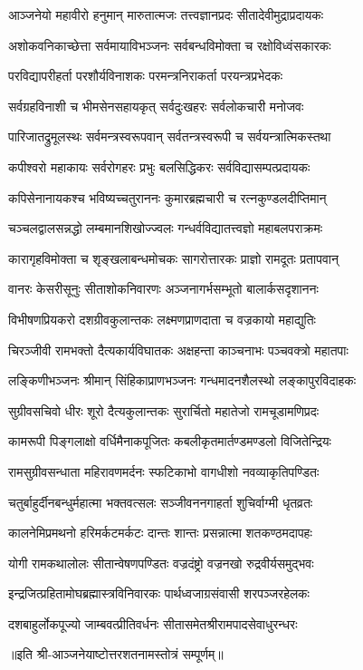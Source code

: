 

\twolineshloka
{आञ्जनेयो महावीरो हनुमान् मारुतात्मजः}
{तत्त्वज्ञानप्रदः सीतादेवीमुद्राप्रदायकः}

\twolineshloka
{अशोकवनिकाच्छेत्ता सर्वमायाविभञ्जनः}
{सर्वबन्धविमोक्ता च रक्षोविध्वंसकारकः}

\twolineshloka
{परविद्यापरीहर्ता परशौर्यविनाशकः}
{परमन्त्रनिराकर्ता परयन्त्रप्रभेदकः}

\twolineshloka
{सर्वग्रहविनाशी च भीमसेनसहायकृत्}
{सर्वदुःखहरः सर्वलोकचारी मनोजवः}

\twolineshloka
{पारिजातद्रुमूलस्थः सर्वमन्त्रस्वरूपवान्}
{सर्वतन्त्रस्वरूपी च सर्वयन्त्रात्मिकस्तथा}

\twolineshloka
{कपीश्वरो महाकायः सर्वरोगहरः प्रभुः}
{बलसिद्धिकरः सर्वविद्यासम्पत्प्रदायकः}

\twolineshloka
{कपिसेनानायकश्च भविष्यच्चतुराननः}
{कुमारब्रह्मचारी च रत्नकुण्डलदीप्तिमान्}

\twolineshloka
{चञ्चलद्वालसन्नद्धो लम्बमानशिखोज्ज्वलः}
{गन्धर्वविद्यातत्त्वज्ञो महाबलपराक्रमः}

\twolineshloka
{कारागृहविमोक्ता च शृङ्खलाबन्धमोचकः}
{सागरोत्तारकः प्राज्ञो रामदूतः प्रतापवान्}

\twolineshloka
{वानरः केसरीसूनुः सीताशोकनिवारणः}
{अञ्जनागर्भसम्भूतो बालार्कसदृशाननः}

\twolineshloka
{विभीषणप्रियकरो दशग्रीवकुलान्तकः}
{लक्ष्मणप्राणदाता च वज्रकायो महाद्युतिः}

\twolineshloka
{चिरञ्जीवी रामभक्तो दैत्यकार्यविघातकः}
{अक्षहन्ता काञ्चनाभः पञ्चवक्त्रो महातपाः}

\twolineshloka
{लङ्किणीभञ्जनः श्रीमान् सिंहिकाप्राणभञ्जनः}
{गन्धमादनशैलस्थो लङ्कापुरविदाहकः}

\twolineshloka
{सुग्रीवसचिवो धीरः शूरो दैत्यकुलान्तकः}
{सुरार्चितो महातेजो रामचूडामणिप्रदः}

\twolineshloka
{कामरूपी पिङ्गलाक्षो वर्धिमैनाकपूजितः}
{कबलीकृतमार्तण्डमण्डलो विजितेन्द्रियः}

\twolineshloka
{रामसुग्रीवसन्धाता महिरावणमर्दनः}
{स्फटिकाभो वागधीशो नवव्याकृतिपण्डितः}

\twolineshloka
{चतुर्बाहुर्दीनबन्धुर्महात्मा भक्तवत्सलः}
{सञ्जीवननगाहर्ता शुचिर्वाग्मी धृतव्रतः}

\twolineshloka
{कालनेमिप्रमथनो हरिमर्कटमर्कटः}
{दान्तः शान्तः प्रसन्नात्मा शतकण्ठमदापहः}

\twolineshloka
{योगी रामकथालोलः सीतान्वेषणपण्डितः}
{वज्रदंष्ट्रो वज्रनखो रुद्रवीर्यसमुद्भवः}

\twolineshloka
{इन्द्रजित्प्रहितामोघब्रह्मास्त्रविनिवारकः}
{पार्थध्वजाग्रसंवासी शरपञ्जरहेलकः}

\twolineshloka
{दशबाहुर्लोकपूज्यो जाम्बवत्प्रीतिवर्धनः}
{सीतासमेतश्रीरामपादसेवाधुरन्धरः}

{॥इति श्री-आञ्जनेयाष्टोत्तरशतनामस्तोत्रं सम्पूर्णम्॥}

